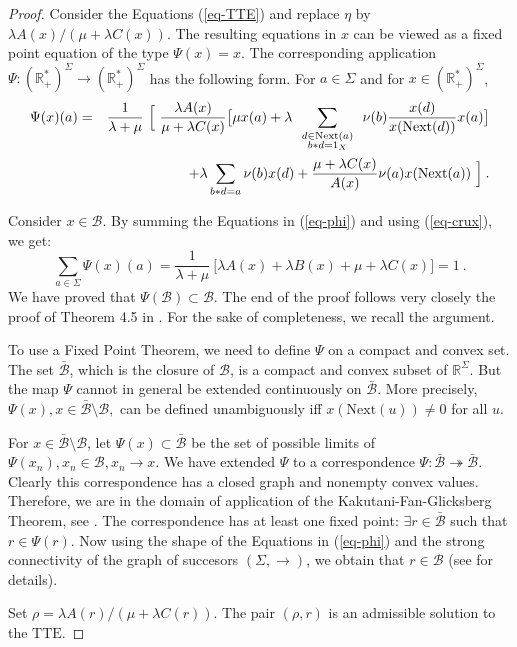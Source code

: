 \documentclass[11pt,a4paper]{article}
\newcommand{\bdl}[2]
{\mbox{$
\renewcommand{\arraystretch}{0.5}
\begin{array}{c}{\scriptstyle #1}\\ {\scriptstyle #2} \end{array}
\renewcommand{\arraystretch}{2}
       $}}
\theoremstyle{remark}
\def\Blackboardfont{\mathbb}
\newcommand{\moins}{ {\setminus} }
\def\rig{\text{Next}}
\def\lef{\text{Next}}
\def\cb{\cB}
\def\closcb{\bar{\cB}}
\def\R{{\Blackboardfont R}}
\def\cB{{\mathcal B}}
\def\eref#1{(\ref{#1})}
\def\corresp{\twoheadrightarrow}
\begin{document}
\begin{proof}
Consider the Equations \eref{eq-TTE} and replace $\eta$ by
$\lambda A(x)/(\mu+\lambda C(x))$. The resulting equations in $x$ can be
viewed as a fixed point equation of the type $\Psi(x)=x$. The
corresponding application $\Psi: (\R_+^*)^{\Sigma}\longrightarrow
(\R_+^*)^{\Sigma}$ has the following form. For $a\in \Sigma$
and for $x\in (\R_+^*)^{\Sigma}$,
\begin{eqnarray}\label{eq-phi}
\Psi(x)(a) & = & \frac{1}{\lambda + \mu} \ \Bigl[ \ \frac{ \lambda
A(x) }{\mu+\lambda
  C(x)} \bigl[ \mu x(a) + \lambda \sum_{\bdl{d\in \lef(a)}{b\ast d =1_X}} \nu(b)
  \frac{x(d)}{x(\rig(d))} x(a) \bigr] \Bigr. \nonumber \\
&& \hspace*{2cm} \Bigl. + \lambda \sum_{b\ast d=a}
  \nu(b)x(d) + \frac{\mu+\lambda C(x)}{ A(x) }
  \nu(a)x(\rig(a)) \ \Bigr]\:.
\end{eqnarray}

Consider $x\in \cb$. By summing the Equations in
\eref{eq-phi} and using \eref{eq-crux}, we get:
\[
\sum_{a\in \Sigma} \Psi(x)(a) = \frac{1}{\lambda + \mu} \ \bigl[
\lambda A(x) + \lambda B(x) + \mu+ \lambda C(x) \bigr] = 1\:.
\]
We have proved that
$\Psi(\cb)\subset
\cb$.
The end of the proof follows very closely the proof of Theorem 4.5 in
\cite{mair04}. For the sake of completeness, we recall the argument.

To use a Fixed Point Theorem, we need to define
$\Psi$ on a compact and convex set.
The set $\closcb$, which is the closure of $\cb$, is a compact
and convex subset of $\R^{\Sigma}$. But the
map $\Psi$ cannot in general be extended continuously on
$\closcb$. More precisely, $\Psi(x), x \in \closcb \moins \cb,$ can be
defined unambiguously iff $x(\rig(u)) \neq 0$ for all $u$.

For $x\in \closcb\moins \cb$, let $\Psi(x)\subset \closcb$ be the
set of possible limits of $\Psi(x_n), x_n\in \cb, x_n\rightarrow
x$. We have extended $\Psi$ to a correspondence $\Psi: \closcb
\corresp \closcb$. Clearly this correspondence has a closed graph
and nonempty convex values. Therefore, we are in the domain of
application of the Kakutani-Fan-Glicksberg Theorem, see
\cite[Chapter 16]{AlBo}. The correspondence has at least one fixed
point: $\exists r\in\closcb$ such that $r\in \Psi(r)$. Now using
the shape of the Equations in \eref{eq-phi} and the strong
connectivity of the graph of succesors $(\Sigma,\rightarrow)$, we obtain
that $r\in \cb$ (see \cite[Theorem 4.5]{mair04} for details).

Set $\rho= \lambda A(r)/(\mu +\lambda C(r))$. The pair $(\rho,r)$ is
an admissible
solution to the $\text{TTE}$.
\end{proof}
\end{document}
